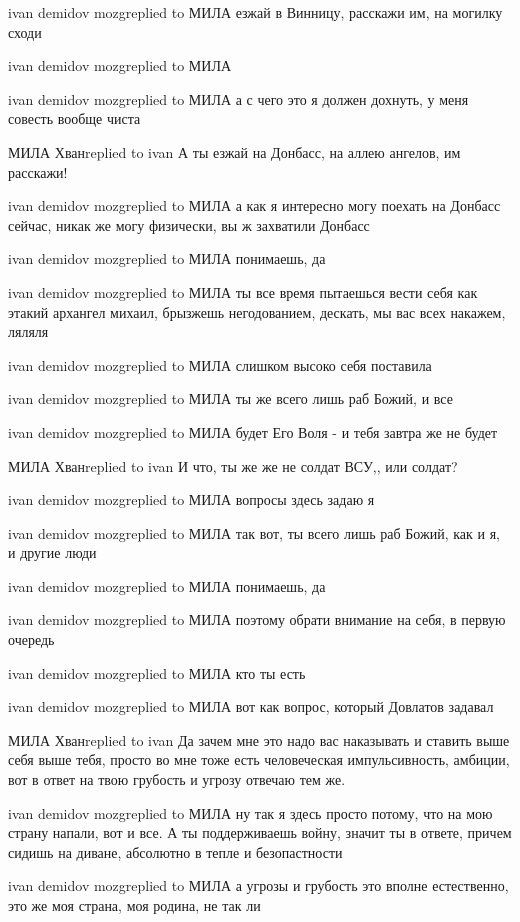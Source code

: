 ivan demidov mozgreplied to МИЛА
езжай в Винницу, расскажи им, на могилку сходи

ivan demidov mozgreplied to МИЛА

ivan demidov mozgreplied to МИЛА
а с чего это я должен дохнуть, у меня совесть вообще чиста

МИЛА Хванreplied to ivan
А ты езжай на Донбасс, на аллею ангелов, им расскажи!

ivan demidov mozgreplied to МИЛА
а как я интересно могу поехать на Донбасс сейчас, никак же могу физически, вы ж захватили Донбасс

ivan demidov mozgreplied to МИЛА
понимаешь, да

ivan demidov mozgreplied to МИЛА
ты все время пытаешься вести себя как этакий архангел михаил, брызжешь негодованием, дескать, мы вас всех накажем, ляляля

ivan demidov mozgreplied to МИЛА
слишком высоко себя поставила

ivan demidov mozgreplied to МИЛА
ты же всего лишь раб Божий, и все

ivan demidov mozgreplied to МИЛА
будет Его Воля - и тебя завтра же не будет

МИЛА Хванreplied to ivan
И что, ты же же не солдат ВСУ,, или солдат?

ivan demidov mozgreplied to МИЛА
вопросы здесь задаю я

ivan demidov mozgreplied to МИЛА
так вот, ты всего лишь раб Божий, как и я, и другие люди

ivan demidov mozgreplied to МИЛА
понимаешь, да

ivan demidov mozgreplied to МИЛА
поэтому обрати внимание на себя, в первую очередь

ivan demidov mozgreplied to МИЛА
кто ты есть

ivan demidov mozgreplied to МИЛА
вот как вопрос, который Довлатов задавал

МИЛА Хванreplied to ivan
Да зачем мне это надо вас наказывать и ставить выше себя выше тебя, просто во мне тоже есть человеческая импульсивность, амбиции, вот в ответ на твою грубость и угрозу отвечаю тем же.

ivan demidov mozgreplied to МИЛА
ну так я здесь просто потому, что на мою страну напали, вот и все. А ты поддерживаешь войну, значит ты в ответе, причем сидишь на диване, абсолютно в тепле и безопастности

ivan demidov mozgreplied to МИЛА
а угрозы и грубость это вполне естественно, это же моя страна, моя родина, не так ли

